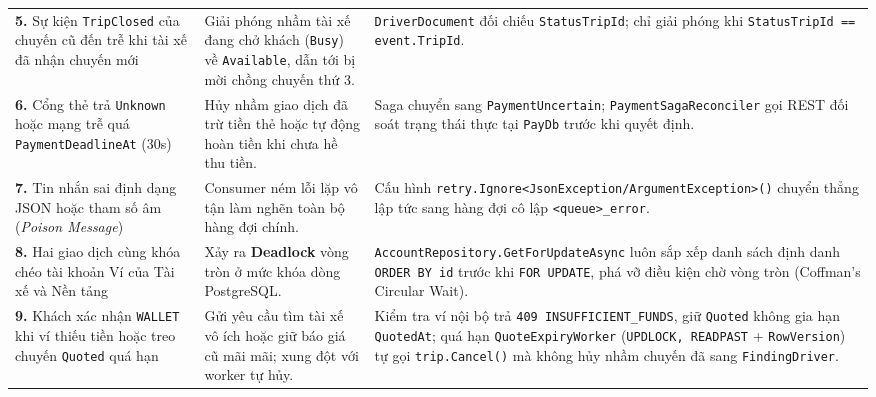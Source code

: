 \documentclass[12pt,a4paper]{article}
\newcommand{\ab}{\allowbreak}
\begin{document}
{\begin{longtable}{L{3.5cm} L{3.5cm} L{7.8cm}}
\textbf{5.} Sự kiện \texttt{TripClosed} của chuyến cũ đến trễ khi tài xế đã nhận chuyến mới & Giải phóng nhầm tài xế đang chở khách (\texttt{Busy}) về \texttt{Available}, dẫn tới bị mời chồng chuyến thứ 3. & \texttt{DriverDocument} đối chiếu \texttt{StatusTripId}; chỉ giải phóng khi \texttt{StatusTripId == event.TripId}. \\
\addlinespace

\textbf{6.} Cổng thẻ trả \texttt{Unknown} hoặc mạng trễ quá \texttt{PaymentDeadlineAt} (30s) & Hủy nhầm giao dịch đã trừ tiền thẻ hoặc tự động hoàn tiền khi chưa hề thu tiền. & Saga chuyển sang \texttt{PaymentUncertain}; \texttt{PaymentSagaReconciler} gọi REST đối soát trạng thái thực tại \texttt{PayDb} trước khi quyết định. \\
\addlinespace

\textbf{7.} Tin nhắn sai định dạng JSON hoặc tham số âm (\textit{Poison Message}) & Consumer ném lỗi lặp vô tận làm nghẽn toàn bộ hàng đợi chính. & Cấu hình \texttt{retry.Ignore<\ab JsonException/\ab ArgumentException>()} chuyển thẳng lập tức sang hàng đợi cô lập \texttt{<queue>\_error}. \\
\addlinespace

\textbf{8.} Hai giao dịch cùng khóa chéo tài khoản Ví của Tài xế và Nền tảng & Xảy ra \textbf{Deadlock} vòng tròn ở mức khóa dòng PostgreSQL. & \texttt{AccountRepository.\ab GetForUpdateAsync} luôn sắp xếp danh sách định danh \texttt{ORDER BY id} trước khi \texttt{FOR UPDATE}, phá vỡ điều kiện chờ vòng tròn (Coffman's Circular Wait). \\
\addlinespace

\textbf{9.} Khách xác nhận \texttt{WALLET} khi ví thiếu tiền hoặc treo chuyến \texttt{Quoted} quá hạn & Gửi yêu cầu tìm tài xế vô ích hoặc giữ báo giá cũ mãi mãi; xung đột với worker tự hủy. & Kiểm tra ví nội bộ trả \texttt{409 INSUFFICIENT\_FUNDS}, giữ \texttt{Quoted} không gia hạn \texttt{QuotedAt}; quá hạn \texttt{QuoteExpiryWorker} (\texttt{UPDLOCK, READPAST} + \texttt{RowVersion}) tự gọi \texttt{trip.Cancel()} mà không hủy nhầm chuyến đã sang \texttt{FindingDriver}. \\
\end{longtable}
\renewcommand{\arraystretch}{1.0}
}
\end{document}
